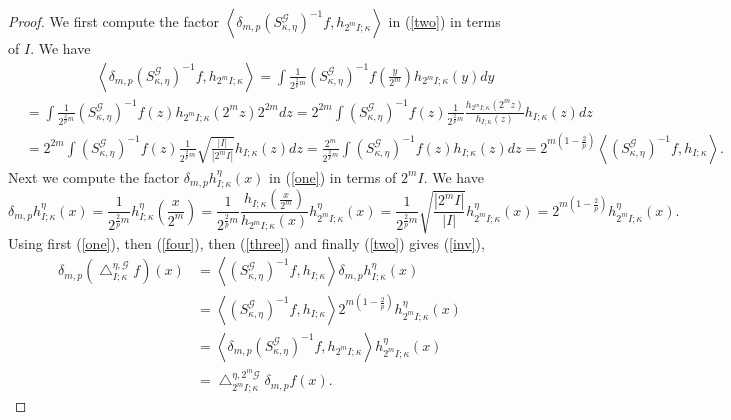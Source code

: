 \documentclass{amsart}%
\theoremstyle{plain}
\numberwithin{equation}{section}
\begin{document}
\begin{proof}
We first compute the factor $\left\langle \delta_{m,p}\left(  S_{\kappa,\eta
}^{\mathcal{G}}\right)  ^{-1}f,h_{2^{m}I;\kappa}\right\rangle $ in (\ref{two})
in terms of $I$. We have%
\begin{align}
&  \ \ \ \ \ \ \ \ \ \ \ \ \ \ \ \ \ \ \ \ \ \ \ \left\langle \delta
_{m,p}\left(  S_{\kappa,\eta}^{\mathcal{G}}\right)  ^{-1}f,h_{2^{m}I;\kappa
}\right\rangle =\int\frac{1}{2^{\frac{2}{p}m}}\left(  S_{\kappa,\eta
}^{\mathcal{G}}\right)  ^{-1}f\left(  \frac{y}{2^{m}}\right)  h_{2^{m}%
I;\kappa}\left(  y\right)  dy\label{three}\\
&  =\int\frac{1}{2^{\frac{2}{p}m}}\left(  S_{\kappa,\eta}^{\mathcal{G}%
}\right)  ^{-1}f\left(  z\right)  h_{2^{m}I;\kappa}\left(  2^{m}z\right)
2^{2m}dz=2^{2m}\int\left(  S_{\kappa,\eta}^{\mathcal{G}}\right)  ^{-1}f\left(
z\right)  \frac{1}{2^{\frac{2}{p}m}}\frac{h_{2^{m}I;\kappa}\left(
2^{m}z\right)  }{h_{I;\kappa}\left(  z\right)  }h_{I;\kappa}\left(  z\right)
dz\nonumber\\
&  =2^{2m}\int\left(  S_{\kappa,\eta}^{\mathcal{G}}\right)  ^{-1}f\left(
z\right)  \frac{1}{2^{\frac{2}{p}m}}\sqrt{\frac{\left\vert I\right\vert
}{\left\vert 2^{m}I\right\vert }}h_{I;\kappa}\left(  z\right)  dz=\frac{2^{m}%
}{2^{\frac{2}{p}m}}\int\left(  S_{\kappa,\eta}^{\mathcal{G}}\right)
^{-1}f\left(  z\right)  h_{I;\kappa}\left(  z\right)  dz=2^{m\left(
1-\frac{2}{p}\right)  }\left\langle \left(  S_{\kappa,\eta}^{\mathcal{G}%
}\right)  ^{-1}f,h_{I;\kappa}\right\rangle .\nonumber
\end{align}
Next we compute the factor $\delta_{m,p}h_{I;\kappa}^{\eta}\left(  x\right)  $
in (\ref{one}) in terms of $2^{m}I$. We have%
\begin{equation}
\delta_{m,p}h_{I;\kappa}^{\eta}\left(  x\right)  =\frac{1}{2^{\frac{2}{p}m}%
}h_{I;\kappa}^{\eta}\left(  \frac{x}{2^{m}}\right)  =\frac{1}{2^{\frac{2}{p}%
m}}\frac{h_{I;\kappa}\left(  \frac{x}{2^{m}}\right)  }{h_{2^{m}I;\kappa
}\left(  x\right)  }h_{2^{m}I;\kappa}^{\eta}\left(  x\right)  =\frac
{1}{2^{\frac{2}{p}m}}\sqrt{\frac{\left\vert 2^{m}I\right\vert }{\left\vert
I\right\vert }}h_{2^{m}I;\kappa}^{\eta}\left(  x\right)  =2^{m\left(
1-\frac{2}{p}\right)  }h_{2^{m}I;\kappa}^{\eta}\left(  x\right)  .\label{four}%
\end{equation}
Using first (\ref{one}), then (\ref{four}), then (\ref{three}) and finally
(\ref{two}) gives (\ref{inv}),%
\begin{align*}
\delta_{m,p}\left(  \bigtriangleup_{I;\kappa}^{\eta,\mathcal{G}}f\right)
\left(  x\right)   &  =\left\langle \left(  S_{\kappa,\eta}^{\mathcal{G}%
}\right)  ^{-1}f,h_{I;\kappa}\right\rangle \delta_{m,p}h_{I;\kappa}^{\eta
}\left(  x\right) \\
&  =\left\langle \left(  S_{\kappa,\eta}^{\mathcal{G}}\right)  ^{-1}%
f,h_{I;\kappa}\right\rangle 2^{m\left(  1-\frac{2}{p}\right)  }h_{2^{m}%
I;\kappa}^{\eta}\left(  x\right) \\
&  =\left\langle \delta_{m,p}\left(  S_{\kappa,\eta}^{\mathcal{G}}\right)
^{-1}f,h_{2^{m}I;\kappa}\right\rangle h_{2^{m}I;\kappa}^{\eta}\left(  x\right)
\\
&  =\bigtriangleup_{2^{m}I;\kappa}^{\eta,2^{m}\mathcal{G}}\delta_{m,p}f\left(
x\right)  .
\end{align*}


\end{proof}
\end{document}
